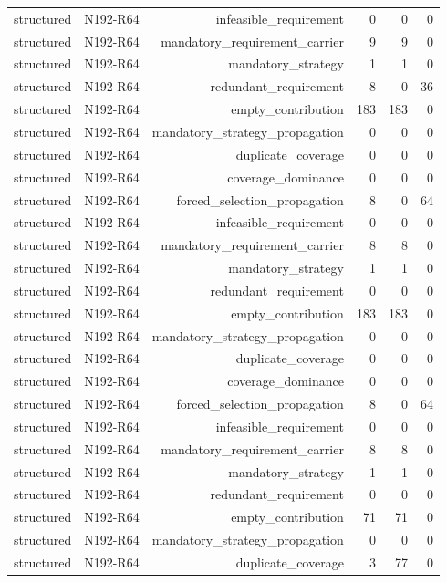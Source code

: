 {\begin{longtable}{lrrrrr}
structured & N192-R64 & infeasible\_requirement & 0 & 0 & 0 \\
structured & N192-R64 & mandatory\_requirement\_carrier & 9 & 9 & 0 \\
structured & N192-R64 & mandatory\_strategy & 1 & 1 & 0 \\
structured & N192-R64 & redundant\_requirement & 8 & 0 & 36 \\
structured & N192-R64 & empty\_contribution & 183 & 183 & 0 \\
structured & N192-R64 & mandatory\_strategy\_propagation & 0 & 0 & 0 \\
structured & N192-R64 & duplicate\_coverage & 0 & 0 & 0 \\
structured & N192-R64 & coverage\_dominance & 0 & 0 & 0 \\
structured & N192-R64 & forced\_selection\_propagation & 8 & 0 & 64 \\
structured & N192-R64 & infeasible\_requirement & 0 & 0 & 0 \\
structured & N192-R64 & mandatory\_requirement\_carrier & 8 & 8 & 0 \\
structured & N192-R64 & mandatory\_strategy & 1 & 1 & 0 \\
structured & N192-R64 & redundant\_requirement & 0 & 0 & 0 \\
structured & N192-R64 & empty\_contribution & 183 & 183 & 0 \\
structured & N192-R64 & mandatory\_strategy\_propagation & 0 & 0 & 0 \\
structured & N192-R64 & duplicate\_coverage & 0 & 0 & 0 \\
structured & N192-R64 & coverage\_dominance & 0 & 0 & 0 \\
structured & N192-R64 & forced\_selection\_propagation & 8 & 0 & 64 \\
structured & N192-R64 & infeasible\_requirement & 0 & 0 & 0 \\
structured & N192-R64 & mandatory\_requirement\_carrier & 8 & 8 & 0 \\
structured & N192-R64 & mandatory\_strategy & 1 & 1 & 0 \\
structured & N192-R64 & redundant\_requirement & 0 & 0 & 0 \\
structured & N192-R64 & empty\_contribution & 71 & 71 & 0 \\
structured & N192-R64 & mandatory\_strategy\_propagation & 0 & 0 & 0 \\
structured & N192-R64 & duplicate\_coverage & 3 & 77 & 0 \\

\end{longtable}}
